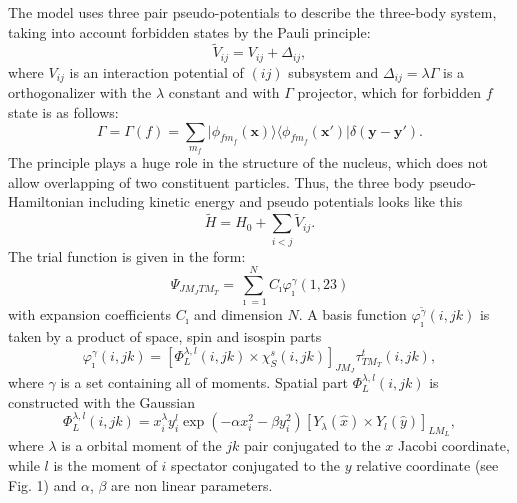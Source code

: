 \documentclass[
11pt, %
english, %
onehalfspacing, %
headsepline, %
]{MastersDoctoralThesis} %
\begin{document}
The model \cite{Kukulin1977} uses three pair pseudo-potentials to describe the three-body system, taking into account forbidden states by the Pauli principle:
\begin{equation}
\label{pseudopot}
\widetilde{V}_{ij}=V_{ij}+\Delta_{ij},
\end{equation}
where $V_{ij}$ is  an interaction potential of $(ij)$ subsystem and $\Delta_{ij}=\lambda \Gamma$ is a orthogonalizer with the $\lambda$ constant and with $\Gamma$ projector, which  for  forbidden $f$ state is as follows:
\begin{equation}
\label{projector}
\Gamma=\Gamma(f)=\sum\limits_{m_f}\vert \phi_{fm_f} ({\mathbf x})\rangle \langle  \phi_{fm_f} ({\mathbf x'}) \vert \delta({\mathbf y - \mathbf y'}).
\end{equation}
The principle plays a huge role in the structure of the nucleus, which does not allow overlapping of two constituent particles. Thus, the three body pseudo-Hamiltonian including kinetic energy and pseudo potentials looks like this
\begin{equation}
\label{pseudohamiltonian}
\widetilde{H}=H_0+\sum_{i < j} \widetilde{V }_{ij}.
\end{equation}
The trial function is given in the form:
\begin{equation}
\Psi_{JM_J TM_T}=\sum_{\imath=1}^N C_{\imath} \varphi_{\imath}^{{\gamma}}(1,23)
\end{equation}
with expansion coefficients $C_{\imath}$ and  dimension $N$. A basis function $\varphi_{\imath}^{\widetilde{\gamma}}(i,jk)$ is taken by a product of space, spin and isospin parts
\begin{equation}
\label{basisfunction}
\varphi_{\imath}^{{\gamma}}(i,jk)=[   \Phi^{\lambda,l}_L(i,jk) \times \chi_S^s(i,jk)   ]_{JM_J} \tau^t_{TM_T}(i,jk),
\end{equation}
where ${{\gamma}}$ is a set containing all of moments. Spatial part $\Phi^{\lambda,l}_L(i,jk)$  is constructed with the Gaussian
\begin{equation}
\Phi^{\lambda,l}_L(i,jk)=x^{\lambda}_iy^{l}_i \exp(-\alpha x^2_i-\beta y^2_i)[Y_\lambda(\widehat{x}) \times Y_l(\widehat{y})]_{LM_L},
\end{equation} 
where $\lambda$ is a orbital moment of the $jk$ pair   conjugated to the $x$ Jacobi coordinate, while $l$ is the moment of  $i$ spectator conjugated to the $y$ relative coordinate (see Fig. 1) and $\alpha$, $\beta$ are non linear parameters.
\end{document}
